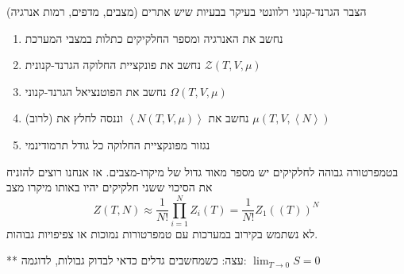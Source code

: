 \begin{cheatformula}
הצבר הגרנד-קנוני רלוונטי בעיקר בבעיות שיש אתרים (מצבים, מדפים, רמות אנרגיה)

\begin{enumerate}
    \item נחשב את האנרגיה ומספר החלקיקים כתלות במצבי המערכת
    \item נחשב את פונקציית החלוקה הגרנד-קנונית $\mathcal{Z}\left( T,V,\mu \right)$
    \item נחשב את הפוטנציאל הגרנד-קנוני $\Omega\left( T,V,\mu \right)$
    \item (לרוב) נחשב את $\left< N \left( T,V,\mu \right) \right>$ וננסה לחלץ את $\mu \left( T,V, \left <N \right> \right)$
    \item נגזור מפונקציית החלוקה כל גודל תרמודינמי
\end{enumerate}

\end{cheatformula}

\begin{cheatformula}
    בטמפרטורה גבוהה לחלקיקים יש מספר מאוד גדול של מיקרו-מצבים. אז אנחנו רוצים להזניח את הסיכוי ששני חלקיקים יהיו באותו מיקרו מצב
    $$Z\left(T,N\right) \approx \frac{1}{N!} \prod_{i=1}^{N}Z_i\left(T \right)= \frac{1}{N!} Z_1\left(\left(T \right)\right)^N$$
לא נשתמש בקירוב במערכות עם טמפרטורות נמוכות או צפיפויות גבוהות.
\end{cheatformula}

** עצה: כשמחשבים גדלים כדאי לבדוק גבולות, לדוגמה:
$\lim_{T\to 0} S = 0$
